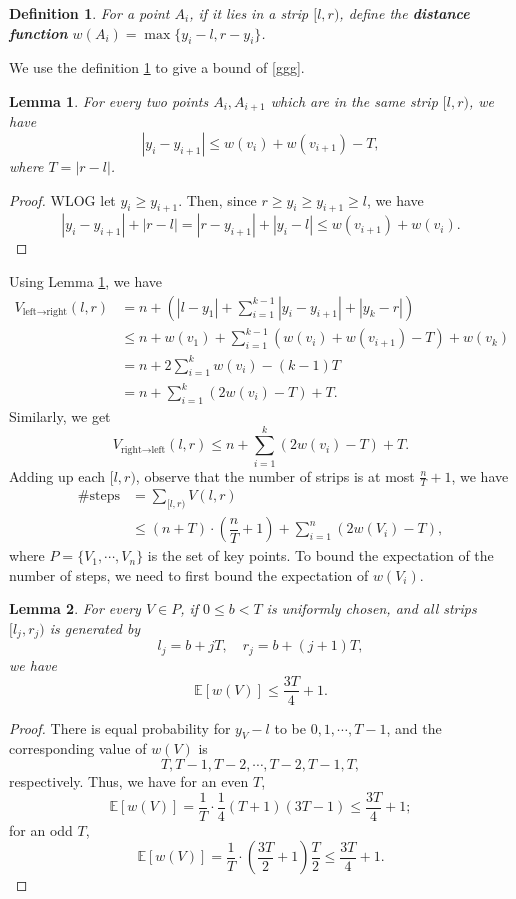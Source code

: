 \documentclass[11pt]{article}
\theoremstyle{plain}
\newtheorem{lemma}{Lemma}[section]
\newtheorem{definition}{Definition}[section]
\begin{document}
\begin{definition}
\label{def5.3}
For a point $A_i$, if it lies in a strip $[l,r)$, define the \textbf{distance function} $w(A_i)=\max\{y_i-l,r-y_i\}$.
\end{definition}
We use the definition \ref{def5.3} to give a bound of \eqref{ggg}.

\begin{lemma}
    \label{ineq}
For every two points $A_i,A_{i+1}$ which are in the same strip $[l,r)$, we have
$$|y_i-y_{i+1}|\le w(v_i)+w(v_{i+1})-T,$$
where $T=|r-l|$.
\end{lemma}
\begin{proof}
WLOG let $y_i\ge y_{i+1}$. Then, since $r\ge y_i\ge y_{i+1}\ge l$, we have
$$|y_i-y_{i+1}|+|r-l|=|r-y_{i+1}|+|y_i-l|\le w(v_{i+1})+w(v_i).$$
\end{proof}

Using Lemma \ref{ineq}, we have
\begin{align*}
V_{\text{left}\to \text{right}}(l,r) &= n+\left(|l-y_1|+\sum\limits_{i=1}^{k-1} |y_{i}-y_{i+1}|+|y_k-r|\right)\\
&\le n + w(v_1) + \sum\limits_{i=1}^{k-1} (w(v_i)+w(v_{i+1})-T) + w(v_k)\\
&= n + 2\sum\limits_{i=1}^{k} w(v_i) - (k-1)T\\
&= n + \sum\limits_{i=1}^k (2w(v_i)-T) + T. 
\end{align*}
Similarly, we get
$$V_{\text{right}\to \text{left}}(l,r)\le n + \sum\limits_{i=1}^k (2w(v_i)-T) + T. $$
Adding up each $[l,r)$, observe that the number of strips is at most $\frac{n}{T}+1$, we have
\begin{align*}
\#\text{steps} &= \sum\limits_{[l,r)} V(l,r)\\
&\le (n+T)\cdot \left(\dfrac{n}{T}+1\right)+\sum\limits_{i=1}^n (2w(V_i)-T),
\end{align*}
where $P=\{V_1,\cdots,V_n\}$ is the set of key points. To bound the expectation of the number of steps, we need to first bound the expectation of $w(V_i)$.

\begin{lemma}
    \label{lemma5.3}
For every $V\in P$, if $0\le b<T$ is uniformly chosen, and all strips $[l_j,r_j)$ is generated by
$$l_j=b+jT,\quad r_j=b+(j+1)T,$$
we have
$$\mathbb{E}[w(V)]\le \dfrac{3T}{4}+1.$$
\end{lemma}
\begin{proof}
There is equal probability for $y_V-l$ to be $0,1,\cdots,T-1$, and the corresponding value of $w(V)$ is
$$T,T-1,T-2,\cdots,T-2,T-1,T,$$
respectively. Thus, we have for an even $T$,
$$\mathbb{E}[w(V)]=\dfrac{1}{T}\cdot \dfrac{1}{4}(T+1)(3T-1)\le \dfrac{3T}{4}+1;$$
for an odd $T$,
$$\mathbb{E}[w(V)]=\dfrac{1}{T}\cdot (\dfrac{3T}{2}+1)\dfrac{T}{2}\le \dfrac{3T}{4}+1.$$
\end{proof}
\end{document}
